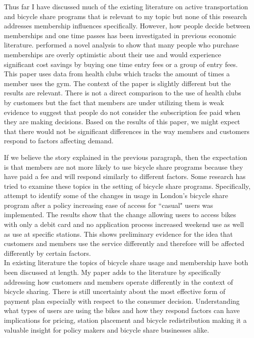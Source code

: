 \documentclass[12pt,letter paper]{article}
\begin{document}
Thus far I have discussed much of the existing literature on active transportation and bicycle share programs that is relevant to my topic but none of this research addresses membership influences specifically.  However, how people decide between memberships and one time passes has been investigated in previous economic literature.  \cite{dellavigna2006paying} performed a novel analysis to show that many people who purchase memberships are overly optimistic about their use and would experience significant cost savings by buying one time entry fees or a group of entry fees.  This paper uses data from health clubs which tracks the amount of times a member uses the gym.  The context of the paper is slightly different but the results are relevant.  There is not a direct comparison to the use of health clubs by customers but the fact that members are under utilizing them is weak evidence to suggest that people do not consider the subscription fee paid when they are making decisions.  Based on the results of this paper, we might expect that there would not be significant differences in the way members and customers respond to factors affecting demand.  

If we believe the story explained in the previous paragraph, then the expectation is that members are not more likely to use bicycle share programs because they have paid a fee and will respond similarly to different factors.  Some research has tried to examine these topics in the setting of bicycle share programs.  Specifically, \cite{lathia2012measuring} attempt to identify some of the changes in usage in London's bicycle share program after a policy increasing ease of access for ``casual" users was implemented.  The results show that the change allowing users to access bikes with only a debit card and no application process increased weekend use as well as use at specific stations.  This shows preliminary evidence for the idea that customers and members use the service differently and therefore will be affected differently by certain factors.   \\

In existing literature the topics of bicycle share usage and membership have both been discussed at length.  My paper adds to the literature by specifically addressing how customers and members operate differently in the context of bicycle sharing.  There is still uncertainty about the most effective form of payment plan especially with respect to the consumer decision.  Understanding what types of users are using the bikes and how they respond factors can have implications for pricing, station placement and bicycle redistribution making it a valuable insight for policy makers and bicycle share businesses alike. 
\end{document}
